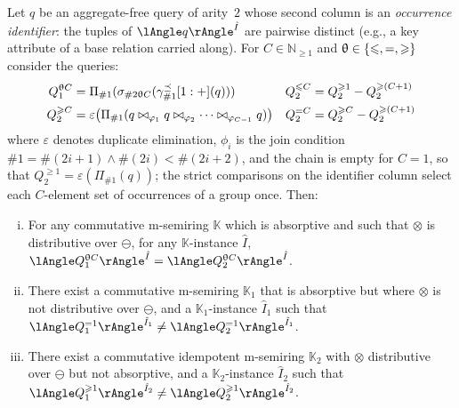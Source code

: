 \begin{theoremrep}\label{th:correctness}
  Let $q$ be an aggregate-free query of arity~$2$ whose second column is
  an \emph{occurrence identifier}: the tuples of $\angsem{\hat I}{q}$ are
  pairwise distinct (e.g., a key attribute of a base relation carried
  along). For $C\in\mathbb{N}_{\ge1}$ and ${\mathrel{\uptheta}}\in \{\leqslant,
  =,\geqslant\}$ consider the queries:
\begin{align*}
    Q^{\mathrel{\uptheta} C}_1&=\Pi_{\#1}(\sigma_{\#2\mathrel{\uptheta} C}(\gamma^{\preceq}_{\#1}[1:+](q)))
    & Q^{\leqslant C}_2&= Q^{\geqslant 1}_2 - Q^{\geqslant (C+1)}_2\\
    Q^{\geqslant C}_2&=\varepsilon\bigl(\Pi_{\#1}(q\bowtie_{\varphi_1}q\bowtie_{\varphi_2}\cdots\bowtie_{\varphi_{C-1}}q)\bigr)
    & Q^{=C}_2&=Q^{\geqslant C}_2 - Q^{\geqslant (C+1)}_2
\end{align*}
where $\varepsilon$ denotes duplicate elimination, $\phi_i$ is the join
condition $\#1=\#(2i+1)\land\#(2i)<\#(2i+2)$, and the chain is empty for
$C=1$, so that $Q^{\geq 1}_2=\varepsilon(\Pi_{\#1}(q))$; the strict
comparisons on the identifier column select each $C$-element set
of occurrences of a group once.
    Then:
    \begin{enumerate}[(i)]
      \item
        For any commutative m-semiring $\mathbb{K}$ which is
        absorptive and such that $\otimes$ is
        distributive over $\ominus$, for any
        $\mathbb{K}$-instance $\hat I$,
        $\angsem{\hat I}{Q^{\op C}_1}=\angsem{\hat I}{Q^{\op C}_2}$.
      \item
        There exist a commutative m-semiring $\mathbb{K}_1$ that is
        absorptive but where $\otimes$ is not distributive over
        $\ominus$, and a $\mathbb{K}_1$-instance $\hat I_1$ such that
        $\angsem{\hat I_1}{Q^{=1}_1}\neq\angsem{\hat I_1}{Q^{=1}_2}$.
      \item
        There exist a commutative idempotent m-semiring $\mathbb{K}_2$
        with $\otimes$ distributive over $\ominus$ but not absorptive,
        and a $\mathbb{K}_2$-instance $\hat I_2$ such that
        $\angsem{\hat I_2}{Q^{\geq 1}_1}\neq\angsem{\hat I_2}{Q^{\geq 1}_2}$.
    \end{enumerate}
\end{theoremrep}
